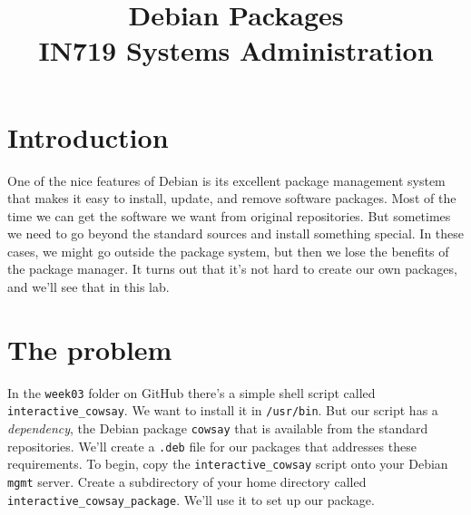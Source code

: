 \documentclass{article}
\begin{document}
\title{Debian Packages\\ IN719 Systems Administration}
\date{}
\maketitle

\section{Introduction}
One of the nice features of Debian is its excellent package management system
that makes it easy to install, update, and remove software packages. Most of the time we can get the software we want from original repositories. But 
sometimes we need to go beyond the standard sources and install something 
special. In these cases, we might go outside the package system, but then we 
lose the benefits of the package manager.  It turns out that it's not hard to 
create our own packages, and we'll see that in this lab.  

\section{The problem}
In the \texttt{week03} folder on GitHub there's a simple shell script called \texttt{interactive\_cowsay}. We want to
install it in \texttt{/usr/bin}. But our script has a \emph{dependency}, the Debian package \texttt{cowsay} that is available from
the standard repositories. We'll create a \texttt{.deb} file for our packages that addresses these requirements. To
begin, copy the \texttt{interactive\_cowsay} script onto your Debian \texttt{mgmt} server. Create a subdirectory of your home
directory called \texttt{interactive\_cowsay\_package}. We'll use it to set up our package.
\end{document}
